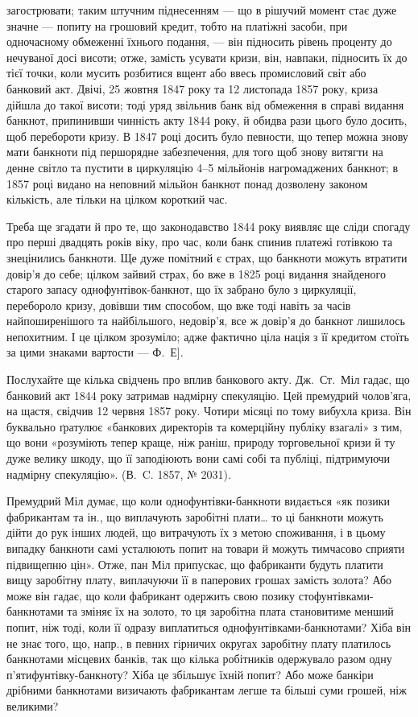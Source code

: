 \parcont{}  %
загострювати; таким штучним піднесенням — що в рішучий момент стає дуже
значне — попиту на грошовий кредит, тобто на платіжні засоби, при одночасному
обмеженні їхнього подання, — він підносить рівень проценту до нечуваної досі
висоти; отже, замість усувати кризи, він, навпаки, підносить їх до тієї точки,
коли мусить розбитися вщент або ввесь промисловий світ або банковий акт.
Двічі, 25 жовтня 1847 року та 12 листопада 1857 року, криза дійшла до такої
висоти; тоді уряд звільнив банк від обмеження в справі видання банкнот, припинивши
чинність акту 1844 року, й обидва рази цього було досить, щоб перебороти
кризу. В 1847 році досить було певности, що тепер можна знову мати
банкноти під першорядне забезпечення, для того щоб знову витягти на денне
світло та пустити в циркуляцію 4--5 мільйонів нагромаджених банкнот; в
1857 році видано на неповний мільйон банкнот понад дозволену законом кількість,
але тільки на цілком короткий час.

Треба ще згадати й про те, що законодавство 1844 року виявляє ще сліди
спогаду про перші двадцять років віку, про час, коли банк спинив платежі готівкою
та знецінились банкноти. Ще дуже помітний є страх, що банкноти можуть
втратити довір’я до себе; цілком зайвий страх, бо вже в 1825 році видання
знайденого старого запасу однофунтівок-банкнот, що їх забрано було з
циркуляції, перебороло кризу, довівши тим способом, що вже тоді навіть за часів
найпоширенішого та найбільшого, недовір’я, все ж довір’я до банкнот лишилось
непохитним. І це цілком зрозуміло; адже фактично ціла нація з її кредитом
стоїть за цими знаками вартости — Ф.~Е].

Послухайте ще кілька свідчень про вплив банкового акту. Дж.~Ст.~Міл
гадає, що банковий акт 1844 року затримав надмірну спекуляцію. Цей премудрий
чолов’яга, на щастя, свідчив 12 червня 1857 року. Чотири місяці по тому
вибухла криза. Він буквально ґратулює «банкових директорів та комерційну
публіку взагалі» з тим, що вони «розуміють тепер краще, ніж раніш, природу
торговельної кризи й ту дуже велику шкоду, що її заподіюють вони самі собі
та публіці, підтримуючи надмірну спекуляцію». (В.~C. 1857, № 2031).

Премудрий Міл думає, що коли однофунтівки-банкноти видається «як позики
фабрикантам та ін., що виплачують заробітні плати\dots{} то ці банкноти
можуть дійти до рук інших людей, що витрачують їх з метою споживання, і в
цьому випадку банкноти самі усталюють попит на товари й можуть тимчасово
сприяти підвищепню цін». Отже, пан Міл припускає, що фабриканти будуть
платити вищу заробітну плату, виплачуючи її в паперових грошах замість золота?
Або може він гадає, що коли фабрикант одержить свою позику стофунтівками-банкнотами
та зміняє їх на золото, то ця заробітна плата становитиме менший
попит, ніж тоді, коли її одразу виплатиться однофунтівками-банкнотами? Хіба
він не знає того, що, напр., в певних гірничих округах заробітну плату платилось
банкнотами місцевих банків, так що кілька робітників одержувало разом
одну п’ятифунтівку-банкноту? Хіба це збільшує їхній попит? Або може банкіри
дрібними банкнотами визичають фабрикантам легше та більші суми грошей,
ніж великими?

